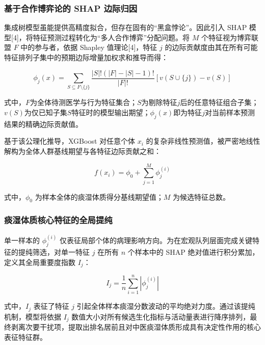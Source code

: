 \documentclass[12pt]{article}
\begin{document}
	\subsubsection{基于合作博弈论的 SHAP 边际归因}
	{\songti{}
		集成树模型虽能提供高精度拟合，但存在固有的“黑盒悖论”。因此引入 SHAP 模型[4]，将特征预测过程转化为“多人合作博弈”分配问题。将 $M$ 个特征视为博弈联盟 $F$ 中的参与者，依据 Shapley 值理论[4]，特征 $j$ 的边际贡献度由其在所有可能特征排列子集中的预期边际增量加权求和推导而得：
		\par}
	
	\begin{equation}
		\phi_j(x) = \sum_{S \subseteq F \setminus \{j\}} \frac{|S|! \left( |F| - |S| - 1 \right)!}{|F|!} \left[ v(S \cup \{j\}) - v(S) \right]
	\end{equation}	
	
	{\songti{}
		式中，$F$为全体待测医学与行为特征集合；$S$为剔除特征$j$后的任意特征组合子集；$v(S)$为仅已知子集$S$特征时的模型输出期望；$\phi_j(x)$即为特征$j$对当前样本预测结果的精确边际贡献值。
		\par}
	
	{\songti{}
		基于该公理化推导，XGBoost 对任意个体 $x_i$ 的复杂非线性预测值，被严密地线性解构为全体人群基线期望与各特征边际贡献之和：
		\par}
	
	\begin{equation}
		f(x_i) = \phi_0 + \sum_{j=1}^{M} \phi_j^{(i)}
	\end{equation}
	
	{\songti{}
		式中，$\phi_0$ 为样本全体的痰湿体质得分基线期望值；$M$ 为候选特征总数。
		\par}
	
	\subsubsection{痰湿体质核心特征的全局提纯}
	{\songti{}
		单一样本的 $\phi_j^{(i)}$ 仅表征局部个体的病理影响方向。为在宏观队列层面完成关键特征的提纯筛选，对单一特征 $j$ 在所有 $n$ 个样本中的 SHAP 绝对值进行积分累加，定义其全局重要度指数 $I_j$：
		\par}
	
	\begin{equation}
		I_j = \frac{1}{n} \sum_{i=1}^{n} |\phi_j^{(i)}|
	\end{equation}
	
	{\songti{}
		式中，$I_j$ 表征了特征 $j$ 引起全体样本痰湿分数波动的平均绝对力度。通过该提纯机制，模型将依据 $I_j$ 数值大小对所有候选生化指标与活动量表进行降序排列，最终剥离次要干扰项，提取出排名居前且对中医痰湿体质形成具有决定性作用的核心表征特征群。
		\par}
	
\end{document}
